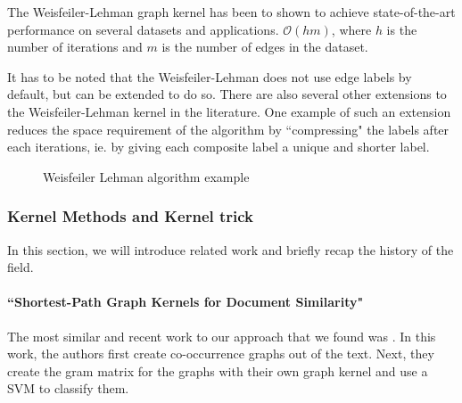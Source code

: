 The Weisfeiler-Lehman graph kernel has been to shown to achieve state-of-the-art performance on several datasets and applications.
$\mathcal{O}(hm)$, where $h$ is the number of iterations and $m$ is the number of edges in the dataset.

It has to be noted that the Weisfeiler-Lehman does not use edge labels by default, but can be extended to do so.
There are also several other extensions to the Weisfeiler-Lehman kernel in the literature.
One example of such an extension reduces the space requirement of the algorithm by ``compressing" the labels after each iterations, ie. by giving each composite label a unique and shorter label.


\begin{figure}[ht]
\centering
\missingfigure[figcolor=white]{}
\caption{Weisfeiler Lehman algorithm example}
\end{figure}

\subsubsection{Kernel Methods and Kernel trick}

In this section, we will introduce related work and briefly recap the history of the field.


\paragraph{``Shortest-Path Graph Kernels for Document Similarity" \cite{Nikolentzos2017a}}
The most similar and recent work to our approach that we found was \cite{Nikolentzos2017a}. In this work, the authors first create co-occurrence graphs out of the text. Next, they create the gram matrix for the graphs with their own graph kernel and use a SVM to classify them.

